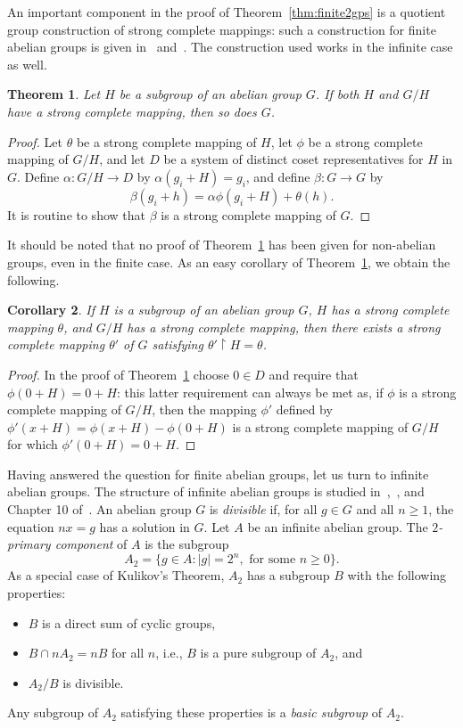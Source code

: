 \documentclass[12pt,a4paper]{article}
\newtheorem{thm}{Theorem}[section]
\newtheorem{cor}[thm]{Corollary}
\newcommand{\rest}{\mathbin{\upharpoonright}}
\begin{document}
An important component in the proof of Theorem~\ref{thm:finite2gps} is a quotient group construction of strong complete mappings: such a construction for finite abelian groups is given in~\cite{Evans:1990} and~\cite{Horton:1990}. The construction used works in the infinite case as well.

\begin{thm}\label{thm:G/H}
Let $H$ be a subgroup of an abelian group $G$. If both $H$ and $G/H$ have a strong complete mapping, then so does $G$.
\end{thm}
\begin{proof}
Let $\theta$ be a strong complete mapping of $H$, let $\phi$ be a strong complete mapping of $G/H$, and let $D$ be a system of distinct coset representatives for $H$ in $G$. Define $\alpha\colon G/H\to D$ by $\alpha(g_i+H)=g_i$, and define $\beta\colon G\to G$ by 
\[
\beta(g_i+h)=\alpha\phi(g_i+H)+\theta(h).
\]
It is routine to show that $\beta$ is a strong complete mapping of $G$.
\end{proof}



It should be noted that no proof of Theorem~\ref{thm:G/H} has been given for non-abelian groups, even in the finite case. As an easy corollary of Theorem~\ref{thm:G/H}, we obtain the following.

\begin{cor}\label{cor:G/H}
If $H$ is a subgroup of an abelian group $G$, $H$ has a strong complete mapping $\theta$, and $G/H$ has a strong complete mapping, then there exists a strong complete mapping $\theta'$ of $G$ satisfying $\theta' \rest H = \theta$.
\end{cor}
\begin{proof}
In the proof of Theorem~\ref{thm:G/H} choose $0\in D$ and require that $\phi(0+H)=0+H$: this latter requirement can always be met as, if $\phi$ is a strong complete mapping of $G/H$, then the mapping $\phi'$ defined by $\phi'(x+H)=\phi(x+H)-\phi(0+H)$  is a strong complete mapping of $G/H$ for which $\phi'(0+H)=0+H$.
\end{proof}

Having answered the question for finite abelian groups, let us turn to infinite abelian groups. The structure of infinite abelian groups is studied in~\cite{Fuchs:2015},~\cite{Kaplansky:1969}, and Chapter 10 of~\cite{Rotman:1995}. An abelian group $G$ is {\em divisible} if, for all $g\in G$ and all $n\ge 1$, the equation $nx=g$ has a solution in $G$. Let $A$ be an infinite abelian group. The {\em $2$-primary component} of $A$ is the subgroup 
\[
A_2=\{g\in A\colon |g|=2^n,\text{ for some }n\ge 0\}.
\] 
As a special case of Kulikov's Theorem, $A_2$ has a subgroup $B$ with the following properties:
\begin{itemize}
\item $B$ is a direct sum of cyclic groups, 
\item $B\cap nA_2=nB$ for all $n$, i.e., $B$ is a pure subgroup of $A_2$, and
\item $A_2/B$ is divisible.
\end{itemize}
Any subgroup of $A_2$ satisfying these properties is a {\em basic subgroup} of $A_2$.
\end{document}
